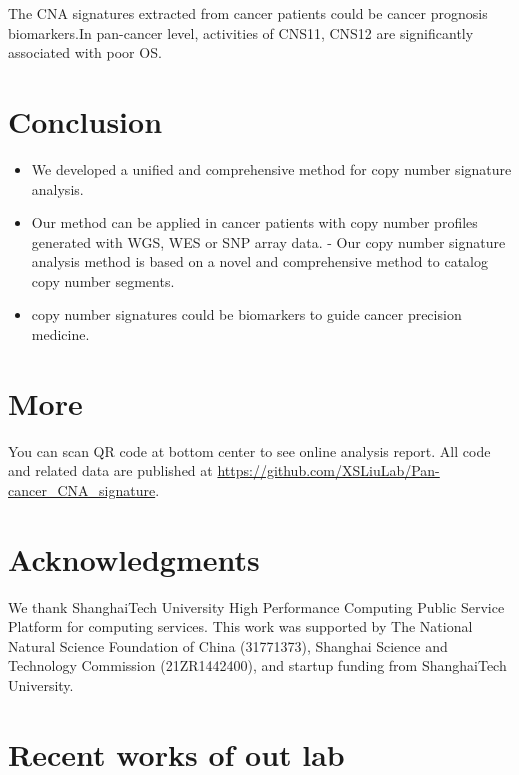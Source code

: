 \documentclass[
]{article}
\providecommand{\tightlist}{%
  \setlength{\itemsep}{0pt}\setlength{\parskip}{0pt}}
\begin{document}
The CNA signatures extracted from cancer patients could be cancer
prognosis biomarkers.In pan-cancer level, activities of CNS11, CNS12 are
significantly associated with poor OS.

\hypertarget{conclusion}{%
\section{Conclusion}\label{conclusion}}

\begin{itemize}
\tightlist
\item
  We developed a unified and comprehensive method for copy number
  signature analysis.
\item
  Our method can be applied in cancer patients with copy number profiles
  generated with WGS, WES or SNP array data. - Our copy number signature
  analysis method is based on a novel and comprehensive method to
  catalog copy number segments.
\item
  copy number signatures could be biomarkers to guide cancer precision
  medicine.
\end{itemize}

\hypertarget{more}{%
\section{More}\label{more}}

You can scan QR code at bottom center to see online analysis report. All
code and related data are published at
\url{https://github.com/XSLiuLab/Pan-cancer_CNA_signature}.

\hypertarget{acknowledgments}{%
\section{Acknowledgments}\label{acknowledgments}}

We thank ShanghaiTech University High Performance Computing Public
Service Platform for computing services. This work was supported by The
National Natural Science Foundation of China (31771373), Shanghai
Science and Technology Commission (21ZR1442400), and startup funding
from ShanghaiTech University.

\hypertarget{recent-works-of-out-lab}{%
\section{Recent works of out lab}\label{recent-works-of-out-lab}}
\end{document}
